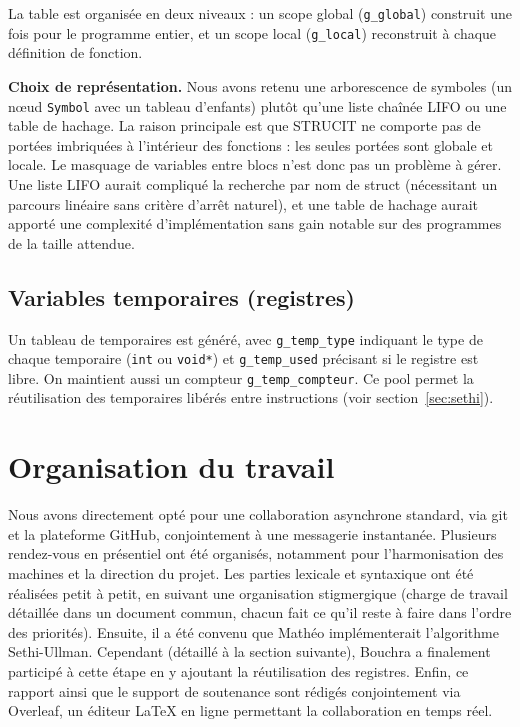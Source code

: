 \documentclass[12pt,a4paper]{article}
\begin{document}
La table est organisée en deux niveaux : un scope global (\texttt{g\_global}) construit une fois pour le programme entier, et un scope local (\texttt{g\_local}) reconstruit à chaque définition de fonction.

\medskip
\textbf{Choix de représentation.} Nous avons retenu une arborescence de symboles (un nœud \texttt{Symbol} avec un tableau d'enfants) plutôt qu'une liste chaînée LIFO ou une table de hachage. La raison principale est que STRUCIT ne comporte pas de portées imbriquées à l'intérieur des fonctions : les seules portées sont globale et locale. Le masquage de variables entre blocs n'est donc pas un problème à gérer. Une liste LIFO aurait compliqué la recherche par nom de struct (nécessitant un parcours linéaire sans critère d'arrêt naturel), et une table de hachage aurait apporté une complexité d'implémentation sans gain notable sur des programmes de la taille attendue.

\subsection{Variables temporaires (registres)}

Un tableau de temporaires est généré, avec \texttt{g\_temp\_type} indiquant le type de chaque temporaire (\texttt{int} ou \texttt{void*}) et \texttt{g\_temp\_used} précisant si le registre est libre. On maintient aussi un compteur \texttt{g\_temp\_compteur}. Ce pool permet la réutilisation des temporaires libérés entre instructions (voir section~\ref{sec:sethi}).

\section{Organisation du travail}

Nous avons directement opté pour une collaboration asynchrone standard, via git et la plateforme GitHub, conjointement à une messagerie instantanée. Plusieurs rendez-vous en présentiel ont été organisés, notamment pour l'harmonisation des machines et la direction du projet. Les parties lexicale et syntaxique ont été réalisées petit à petit, en suivant une organisation stigmergique (charge de travail détaillée dans un document commun, chacun fait ce qu'il reste à faire dans l'ordre des priorités). Ensuite, il a été convenu que Mathéo implémenterait l'algorithme Sethi-Ullman. Cependant (détaillé à la section suivante), Bouchra a finalement participé à cette étape en y ajoutant la réutilisation des registres. Enfin, ce rapport ainsi que le support de soutenance sont rédigés conjointement via Overleaf, un éditeur \LaTeX{} en ligne permettant la collaboration en temps réel.
\end{document}
